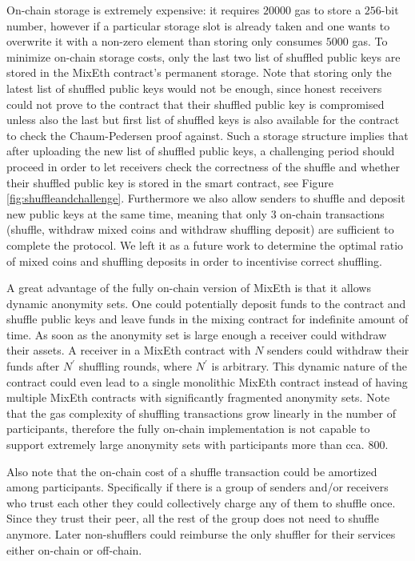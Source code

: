 \documentclass[conference, compsoc]{IEEEtran}
\theoremstyle{definition}
\begin{document}
On-chain storage is extremely expensive: it requires $\num[group-separator={,}]{20000}$ gas to store a $256$-bit number, however if a particular storage slot is already taken and one wants to overwrite it with a non-zero element than storing only consumes $\num[group-separator={,}]{5000}$ gas. To minimize on-chain storage costs, only the last two list of shuffled public keys are stored in the MixEth contract's permanent storage. Note that storing only the latest list of shuffled public keys would not be enough, since honest receivers could not prove to the contract that their shuffled public key is compromised unless also the last but first list of shuffled keys is also available for the contract to check the Chaum-Pedersen proof against. Such a storage structure implies that after uploading the new list of shuffled public keys, a challenging period should proceed in order to let receivers check the correctness of the shuffle and whether their shuffled public key is stored in the smart contract, see Figure \ref{fig:shuffleandchallenge}. Furthermore we also allow senders to shuffle and deposit new public keys at the same time, meaning that only $3$ on-chain transactions (shuffle, withdraw mixed coins and withdraw shuffling deposit) are sufficient to complete the protocol. We left it as a future work to determine the optimal ratio of mixed coins and shuffling deposits in order to incentivise correct shuffling.

A great advantage of the fully on-chain version of MixEth is that it allows dynamic anonymity sets. One could potentially deposit funds to the contract and shuffle public keys and leave funds in the mixing contract for indefinite amount of time. As soon as the anonymity set is large enough a receiver could withdraw their assets. A receiver in a MixEth contract with $N$ senders could withdraw their funds after $N^{'}$ shuffling rounds, where $N^{'}$ is arbitrary. This dynamic nature of the contract could even lead to a single monolithic MixEth contract instead of having multiple MixEth contracts with significantly fragmented anonymity sets. Note that the gas complexity of shuffling transactions grow linearly in the number of participants, therefore the fully on-chain implementation is not capable to support extremely large anonymity sets with participants more than cca. $\num[group-separator={,}]{800}$. 

Also note that the on-chain cost of a shuffle transaction could be amortized among participants. Specifically if there is a group of senders and/or receivers who trust each other they could collectively charge any of them to shuffle once. Since they trust their peer, all the rest of the group does not need to shuffle anymore. Later non-shufflers could reimburse the only shuffler for their services either on-chain or off-chain. 
\end{document}
